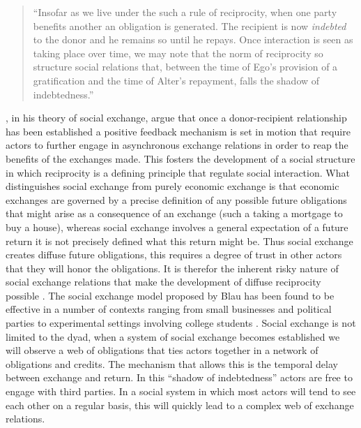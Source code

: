 \begin{quote}
  ``Insofar as we live under the such a rule of reciprocity, when one party benefits another an obligation is generated. The recipient is now \textsl{indebted} to the donor and he remains so until he repays. Once interaction is seen as taking place over time, we may note that the norm of reciprocity so structure social relations that, between  the time of Ego's provision of a gratification and the time of Alter's repayment, falls the shadow of indebtedness.''
\end{quote}

\citet{Blau1964}, in his theory of social exchange, argue that once a donor-recipient relationship has been established a positive feedback mechanism is set in motion that require actors to further engage in asynchronous exchange relations in order to reap the benefits of the exchanges made. This fosters the development of a social structure in which reciprocity is a defining principle that regulate social interaction. What distinguishes social exchange from purely economic exchange is that economic exchanges are governed by a precise definition of any possible future obligations that might arise as a consequence of an exchange (such a taking a mortgage to buy a house), whereas social exchange involves a general expectation of a future return it is not precisely defined what this return might be. Thus social exchange creates diffuse future obligations, this requires a degree of trust in other actors that they will honor the obligations. It is therefor the inherent risky nature of social exchange relations that make the development of diffuse reciprocity possible \citep[94]{Blau1964}. The social exchange model proposed by Blau has been found to be effective in a number of contexts ranging from small businesses and political parties to experimental settings involving college students \citetext{for an overview see \citealt{CropanzanoMitchell2005}}. Social exchange is not limited to the dyad, when a system of social exchange becomes established we will observe a web of obligations that ties actors together in a network of obligations and credits. The mechanism that allows this is the temporal delay between exchange and return. In this ``shadow of indebtedness'' actors are free to engage with third parties. In a social system in which most actors will tend to see each other on a regular basis, this will quickly lead to a complex web of exchange relations. 

